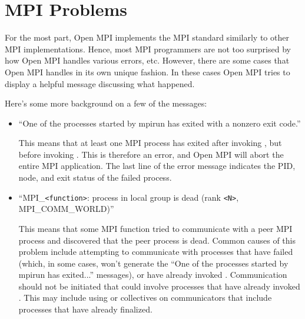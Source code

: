 
\section{MPI Problems}

For the most part, Open MPI implements the MPI standard similarly to other
MPI implementations.  Hence, most MPI programmers are not too
surprised by how Open MPI handles various errors, etc.  However, there are
some cases that Open MPI handles in its own unique fashion.  In these cases
Open MPI tries to display a helpful message discussing what happened.  

Here's some more background on a few of the messages:

\begin{itemize}
\item ``One of the processes started by mpirun has exited with a
  nonzero exit code.''
  
  This means that at least one MPI process has exited after invoking
  , but before invoking
  .  This is therefore an error, and Open MPI
  will abort the entire MPI application.  The last line of the error
  message indicates the PID, node, and exit status of the failed
  process.
  
\item ``MPI\_{\tt <function>}: process in local group is dead (rank
  {\tt <N>}, MPI\_\-COMM\_\-WORLD)''
  
  This means that some MPI function tried to communicate with a peer
  MPI process and discovered that the peer process is dead.  Common
  causes of this problem include attempting to communicate with
  processes that have failed (which, in some cases, won't generate the
  ``One of the processes started by mpirun has exited...'' messages),
  or have already invoked .  Communication
  should not be initiated that could involve processes that have
  already invoked .  This may include using
   or collectives on communicators that
  include processes that have already finalized.
\end{itemize}
